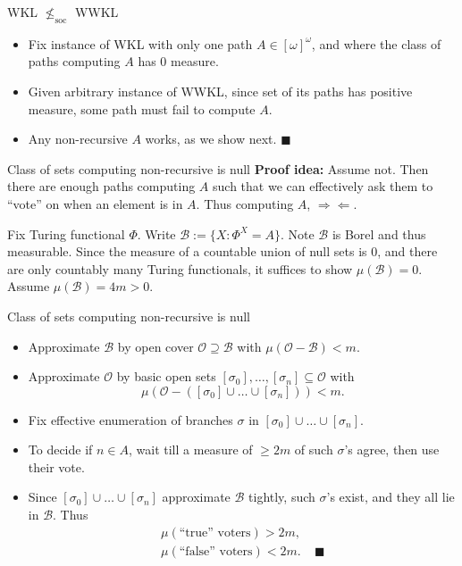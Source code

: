 \begin{frame}{WKL $\nleq_{\text{soc}}$ WWKL}
  \begin{itemize}
    \item Fix instance of WKL with only one path $A\in[\omega]^\omega$, and
      where the class of paths computing $A$ has 0 measure.
    \item Given arbitrary instance of WWKL, since set of its paths has
      positive measure, some path must fail to compute $A$.
    \item Any non-recursive $A$ works, as we show next.
      $\blacksquare$
  \end{itemize}
\end{frame}

\begin{frame}{Class of sets computing non-recursive is null}
  \textbf{Proof idea:} Assume not. Then there are enough paths computing
  $A$ such that we can effectively ask them to ``vote'' on when an element
  is in $A$. Thus computing $A$, $\Rightarrow\Leftarrow$.

  \vspace{1em}
  Fix Turing functional $\Phi$. Write $\mathcal{B} :=\{X:
  \Phi^X=A\}$. Note $\mathcal{B}$ is Borel and thus measurable.
  Since the measure of a countable union of null sets is 0, and
  there are only countably many Turing functionals, it suffices to show
  $\mu(\mathcal{B})=0$. Assume $\mu(\mathcal{B})=4m>0$.
\end{frame}

\begin{frame}{Class of sets computing non-recursive is null}
  \begin{itemize}
    \item Approximate $\mathcal{B}$ by open cover
      $\mathcal{O}\supseteq\mathcal{B}$ with
      $\mu(\mathcal{O}-\mathcal{B})<m$.
    \item Approximate $\mathcal{O}$ by basic open sets
      $[\sigma_0],\ldots,[\sigma_n] \subseteq\mathcal{O}$ with
      \[\mu(\mathcal{O}-([\sigma_0]\cup\ldots\cup[\sigma_n])) <m.\]
    \item Fix effective enumeration of branches $\sigma$ in
      $[\sigma_0]\cup\ldots\cup[\sigma_n]$.
    \item To decide if $n\in A$, wait till a measure of $\geq2m$ of such
      $\sigma$'s agree, then use their vote.
    \item Since $[\sigma_0]\cup\ldots\cup[\sigma_n]$ approximate
      $\mathcal{B}$ tightly, such $\sigma$'s exist, and they all lie in
      $\mathcal{B}$. Thus
      \begin{align*}
        \mu(\text{``true'' voters})>2m,\\
        \mu(\text{``false'' voters})<2m. &\;\blacksquare
      \end{align*}
  \end{itemize}
\end{frame}

